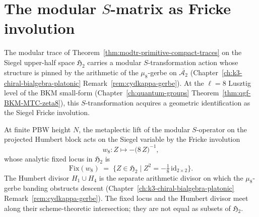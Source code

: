 \section{The modular \texorpdfstring{$S$}{S}-matrix as Fricke involution}
\label{sec:modtr-s-matrix-fricke}

The modular trace of Theorem~\ref{thm:modtr-primitive-compact-traces} on the Siegel
upper-half space $\mathfrak H_2$ carries a modular $S$-transformation
action whose structure is pinned by the arithmetic of the $\mu_8$-gerbe
on $\overline{\mathcal A_2}$ (Chapter~\ref{ch:k3-chiral-bialgebra-platonic}
Remark~\ref{rem:cydkappa-gerbe}). At the
$\ell = 8$ Lusztig level of the BKM small-form
(Chapter~\ref{ch:quantum-groups}
Theorem~\ref{thm:qgf-BKM-MTC-zeta8}), this $S$-transformation acquires
a geometric identification as the Siegel Fricke involution.

\begin{theorem}
\label{thm:modtr-s-matrix-fricke}
At finite PBW height \(N\), the metaplectic lift of the modular
\(S\)-operator on the projected Humbert block acts on the Siegel
variable by the Fricke involution
\[
 w_8\colon Z \longmapsto -\bigl(8\,Z\bigr)^{-1},
\]
whose analytic fixed locus in \(\mathfrak H_2\) is
\[
 \mathrm{Fix}(w_8)
 \;=\;
 \bigl\{Z\in\mathfrak H_2 \mid Z^2 = -\tfrac18\,\mathrm{id}_{2\times 2}\bigr\}.
\]
The Humbert divisor \(H_1\cup H_4\) is the separate arithmetic divisor
on which the \(\mu_8\)-gerbe banding obstructs descent
(Chapter~\ref{ch:k3-chiral-bialgebra-platonic}
Remark~\ref{rem:cydkappa-gerbe}). The fixed locus and the Humbert
divisor meet along their scheme-theoretic intersection; they are not
equal as subsets of \(\mathfrak H_2\).
\end{theorem}

